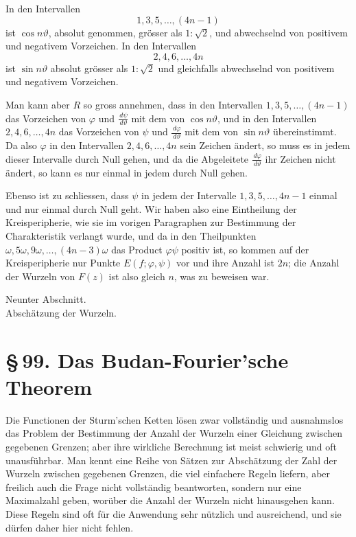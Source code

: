 \documentclass[11pt]{article}
\providecommand{\dd}{\,d}
\providecommand{\sect}[2]{\section*{\S\,#1. #2}}
\begin{document}
In den Intervallen
\[
        1,3,5,\ldots,(4n-1)
\]
ist $\cos n\vartheta$, absolut genommen, grösser als $1:\sqrt2$, und abwechselnd von positivem und negativem Vorzeichen. In den Intervallen
\[
        2,4,6,\ldots,4n
\]
ist $\sin n\vartheta$ absolut grösser als $1:\sqrt2$ und gleichfalls abwechselnd von positivem und negativem Vorzeichen.

Man kann aber $R$ so gross annehmen, dass in den Intervallen $1,3,5,\ldots,(4n-1)$ das Vorzeichen von $\varphi$ und $\frac{\dd\psi}{\dd\vartheta}$ mit dem von $\cos n\vartheta$, und in den Intervallen $2,4,6,\ldots,4n$ das Vorzeichen von $\psi$ und $\frac{\dd\varphi}{\dd\vartheta}$ mit dem von $\sin n\vartheta$ übereinstimmt. Da also $\varphi$ in den Intervallen $2,4,6,\ldots,4n$ sein Zeichen ändert, so muss es in jedem dieser Intervalle durch Null gehen, und da die Abgeleitete $\frac{\dd\varphi}{\dd\vartheta}$ ihr Zeichen nicht ändert, so kann es nur einmal in jedem durch Null gehen.

Ebenso ist zu schliessen, dass $\psi$ in jedem der Intervalle $1,3,5,\ldots,4n-1$ einmal und nur einmal durch Null geht. Wir haben also eine Eintheilung der Kreisperipherie, wie sie im vorigen Paragraphen zur Bestimmung der Charakteristik verlangt wurde, und da in den Theilpunkten $\omega,5\omega,9\omega,\ldots,(4n-3)\omega$ das Product $\varphi\psi$ positiv ist, so kommen auf der Kreisperipherie nur Punkte $E(f;\varphi,\psi)$ vor und ihre Anzahl ist $2n$; die Anzahl der Wurzeln von $F(z)$ ist also gleich $n$, was zu beweisen war.


\clearpage

\begin{center}
{\large Neunter Abschnitt.}\\[0.6em]
{\Large Abschätzung der Wurzeln.}
\end{center}

\sect{99}{Das Budan-Fourier'sche Theorem}

Die Functionen der Sturm'schen Ketten lösen zwar vollständig und ausnahmslos das Problem der Bestimmung der Anzahl der Wurzeln einer Gleichung zwischen gegebenen Grenzen; aber ihre wirkliche Berechnung ist meist schwierig und oft unausführbar. Man kennt eine Reihe von Sätzen zur Abschätzung der Zahl der Wurzeln zwischen gegebenen Grenzen, die viel einfachere Regeln liefern, aber freilich auch die Frage nicht vollständig beantworten, sondern nur eine Maximalzahl geben, worüber die Anzahl der Wurzeln nicht hinausgehen kann. Diese Regeln sind oft für die Anwendung sehr nützlich und ausreichend, und sie dürfen daher hier nicht fehlen.
\end{document}
